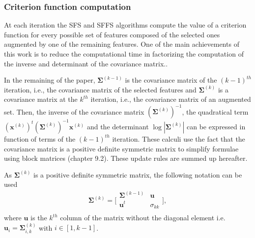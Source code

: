 \documentclass[journal,peerreview,onecolumn]{IEEEtran}
\begin{document}
        \subsubsection{Criterion function computation}
        \label{sec:update-crit}

        At each iteration the SFS and SFFS algorithms compute the value of a criterion function for every possible set of features composed of the selected ones augmented by one of the remaining features. One of the main achievements of this work is to reduce the computational time in factorizing the computation of the inverse and determinant of the covariance matrix..

        In the remaining of the paper, $\boldsymbol{\Sigma}^{(k-1)}$ is the covariance matrix of the $(k-1)^{th}$ iteration, i.e., the covariance matrix of the selected features and $\boldsymbol{\Sigma}^{(k)}$ is a covariance matrix at the $k^{th}$ iteration, i.e., the covariance matrix of an augmented set. Then, the inverse of the covariance matrix $(\boldsymbol{\Sigma}^{(k)})^{-1}$, the quadratical term $(\mathbf{x}^{(k)})^t (\boldsymbol{\Sigma}^{(k)})^{-1} \mathbf{x}^{(k)}$ and the determinant $\log |\boldsymbol{\Sigma}^{(k)}|$ can be expressed in function of terms of the $(k-1)^{th}$ iteration. These calculi use the fact that the covariance matrix is a positive definite symmetric matrix to simplify formulae using block matrices \cite{webb2003statistical} (chapter 9.2). These update rules are summed up hereafter.

        As $\boldsymbol{\Sigma}^{(k)}$ is a positive definite symmetric matrix, the following notation can be used
        \begin{equation*}
            \boldsymbol{\Sigma}^{(k)} =
            \bigg[\begin{array}{cc}
            \boldsymbol{\Sigma}^{(k-1)} & \mathbf{u}      \\
            \mathbf{u}^t          & \sigma_{kk} \\
            \end{array}\bigg],
        \end{equation*}
        where $\mathbf{u}$ is the $k^{th}$ column of the matrix without the diagonal element i.e. $\mathbf{u}_{i} = \boldsymbol{\Sigma}^{(k)}_{i,k}$ with $i \in [1,k-1]$.
\end{document}
